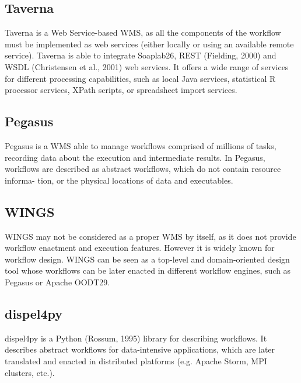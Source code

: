 \subsection{Taverna}	
Taverna \cite{DBLP:journals/bioinformatics/OinnAFMSGCGPWL04} is a Web Service-based WMS, as all the components of the workflow must be implemented as web services (either locally or using an available remote service). Taverna is able to integrate Soaplab26, REST (Fielding, 2000) and WSDL (Christensen et al., 2001) web services. It offers a wide range of services for different processing capabilities, such as local Java services, statistical R processor services, XPath scripts, or spreadsheet import services.

\subsection{Pegasus}
Pegasus \cite{deelman2004pegasus} is a WMS able to manage workflows comprised of millions of tasks, recording data about the execution and intermediate results. In Pegasus, workflows are described as abstract workflows, which do not contain resource informa- tion, or the physical locations of data and executables.

\subsection{WINGS} 
WINGS \cite{DBLP:journals/expert/GilRKGGMD11}  may not be considered as a proper WMS by itself, as it does not provide workflow enactment and execution features. However it is widely known for workflow design. WINGS can be seen as a top-level and domain-oriented design tool whose workflows can be later enacted in different workflow engines, such as Pegasus or Apache OODT29.

\subsection{dispel4py}
dispel4py \cite{DBLP:conf/eScience/FilgueiraKAKSS15}  is a Python (Rossum, 1995) library for describing workflows. It describes abstract workflows for data-intensive applications, which are later translated and enacted in distributed platforms (e.g. Apache Storm, MPI clusters, etc.).


